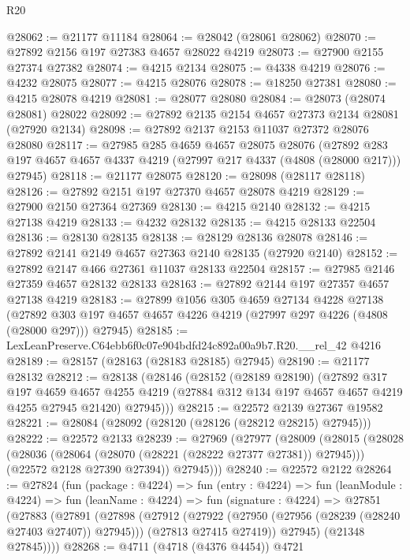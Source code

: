 \begin{lexlean}{R20}
\begin{coremodule}
@28062 := @21177 @11184
@28064 := @28042 (@28061 @28062)
@28070 := @27892 @2156 @197 @27383 @4657 @28022 @4219
@28073 := @27900 @2155 @27374 @27382
@28074 := @4215 @2134
@28075 := @4338 @4219
@28076 := @4232 @28075
@28077 := @4215 @28076
@28078 := @18250 @27381
@28080 := @4215 @28078 @4219
@28081 := @28077 @28080
@28084 := @28073 (@28074 @28081) @28022
@28092 := @27892 @2135 @2154 @4657 @27373 @2134 @28081 (@27920 @2134)
@28098 := @27892 @2137 @2153 @11037 @27372 @28076 @28080
@28117 := @27985
    @285
    @4659
    @4657
    @28075
    @28076
    (@27892 @283 @197 @4657 @4657 @4337 @4219 (@27997 @217 @4337 (@4808 (@28000 @217))) @27945)
@28118 := @21177 @28075
@28120 := @28098 (@28117 @28118)
@28126 := @27892 @2151 @197 @27370 @4657 @28078 @4219
@28129 := @27900 @2150 @27364 @27369
@28130 := @4215 @2140
@28132 := @4215 @27138 @4219
@28133 := @4232 @28132
@28135 := @4215 @28133 @22504
@28136 := @28130 @28135
@28138 := @28129 @28136 @28078
@28146 := @27892 @2141 @2149 @4657 @27363 @2140 @28135 (@27920 @2140)
@28152 := @27892 @2147 @466 @27361 @11037 @28133 @22504
@28157 := @27985 @2146 @27359 @4657 @28132 @28133
@28163 := @27892 @2144 @197 @27357 @4657 @27138 @4219
@28183 := @27899
    @1056
    @305
    @4659
    @27134
    @4228
    @27138
    (@27892 @303 @197 @4657 @4657 @4226 @4219 (@27997 @297 @4226 (@4808 (@28000 @297))) @27945)
@28185 := LexLeanPreserve.C64ebb6f0c07e904bdfd24c892a00a9b7.R20.__rel_42 @4216
@28189 := @28157 (@28163 (@28183 @28185) @27945)
@28190 := @21177 @28132
@28212 := @28138
    (@28146
      (@28152
        (@28189 @28190)
        (@27892
          @317
          @197
          @4659
          @4657
          @4255
          @4219
          (@27884 @312 @134 @197 @4657 @4657 @4219 @4255 @27945 @21420)
          @27945)))
@28215 := @22572 @2139 @27367 @19582
@28221 := @28084 (@28092 (@28120 (@28126 (@28212 @28215) @27945)))
@28222 := @22572 @2133
@28239 := @27969
    (@27977
      (@28009
        (@28015
          (@28028
            (@28036 (@28064 (@28070 (@28221 (@28222 @27377 @27381)) @27945)))
            (@22572 @2128 @27390 @27394))
          @27945)))
@28240 := @22572 @2122
@28264 := @27824
    (fun (package : @4224) =>
    fun (entry : @4224) =>
    fun (leanModule : @4224) =>
    fun (leanName : @4224) =>
    fun (signature : @4224) =>
    @27851
      (@27883
        (@27891
          (@27898
            (@27912
              (@27922 (@27950 (@27956 (@28239 (@28240 @27403 @27407)) @27945)))
              (@27813 @27415 @27419))
            @27945)
          (@21348 @27845))))
@28268 := @4711 (@4718 (@4376 @4454)) @4721

\end{coremodule}
\end{lexlean}
